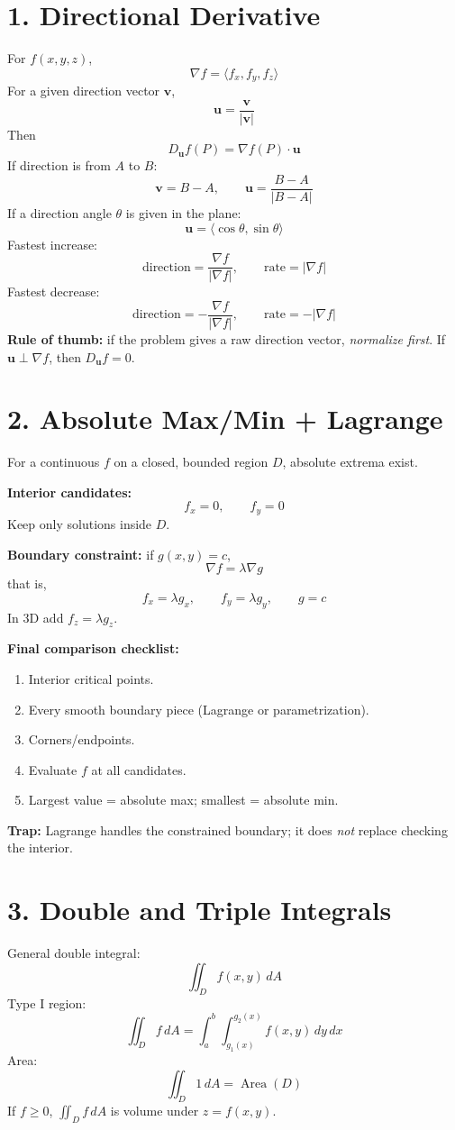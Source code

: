 \documentclass[10pt,a4paper]{article}
\newcommand{\boxeq}[1]{\[\boxed{#1}\]}
\begin{document}
\begin{multicols}{2}

\section*{1. Directional Derivative}
For $f(x,y,z)$,
\boxeq{\nabla f=\langle f_x,f_y,f_z\rangle}
For a given direction vector $\mathbf v$,
\boxeq{\mathbf u=\frac{\mathbf v}{|\mathbf v|}}
Then
\boxeq{D_{\mathbf u}f(P)=\nabla f(P)\cdot\mathbf u}
If direction is from $A$ to $B$:
\boxeq{\mathbf v=B-A,\qquad \mathbf u=\frac{B-A}{|B-A|}}
If a direction angle $\theta$ is given in the plane:
\boxeq{\mathbf u=\langle\cos\theta,\sin\theta\rangle}
Fastest increase:
\boxeq{\text{direction}=\frac{\nabla f}{|\nabla f|},\qquad \text{rate}=|\nabla f|}
Fastest decrease:
\boxeq{\text{direction}=-\frac{\nabla f}{|\nabla f|},\qquad \text{rate}=-|\nabla f|}
\textbf{Rule of thumb:} if the problem gives a raw direction vector, \emph{normalize first}. If $\mathbf u\perp \nabla f$, then $D_{\mathbf u}f=0$.

\section*{2. Absolute Max/Min + Lagrange}
For a continuous $f$ on a closed, bounded region $D$, absolute extrema exist.

\textbf{Interior candidates:}
\boxeq{f_x=0,\qquad f_y=0}
Keep only solutions inside $D$.

\textbf{Boundary constraint:} if $g(x,y)=c$,
\boxeq{\nabla f=\lambda\nabla g}
that is,
\boxeq{f_x=\lambda g_x,\qquad f_y=\lambda g_y,\qquad g=c}
In 3D add $f_z=\lambda g_z$.

\textbf{Final comparison checklist:}
\begin{enumerate}
\item Interior critical points.
\item Every smooth boundary piece (Lagrange or parametrization).
\item Corners/endpoints.
\item Evaluate $f$ at all candidates.
\item Largest value = absolute max; smallest = absolute min.
\end{enumerate}
\textbf{Trap:} Lagrange handles the constrained boundary; it does \emph{not} replace checking the interior.

\section*{3. Double and Triple Integrals}
General double integral:
\boxeq{\iint_D f(x,y)\,dA}
Type I region:
\boxeq{\iint_D f\,dA=\int_a^b\int_{g_1(x)}^{g_2(x)} f(x,y)\,dy\,dx}
Area:
\boxeq{\iint_D 1\,dA=\operatorname{Area}(D)}
If $f\ge 0$, $\iint_D f\,dA$ is volume under $z=f(x,y)$.


\end{multicols}
\end{document}
